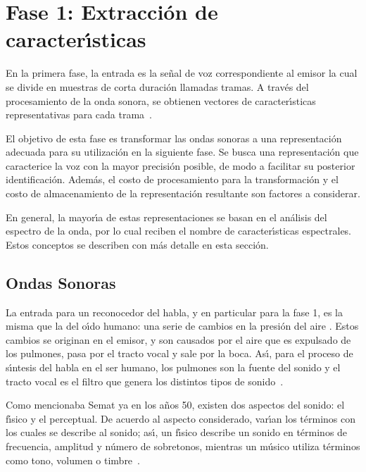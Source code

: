 \section{Fase 1: Extracci\'on de caracter{\'\i}sticas}
\label{sec:featureExtraction}

En la primera fase, la entrada es la se\~nal de voz correspondiente al emisor la cual se divide
en muestras de corta duraci\'on llamadas tramas. A trav\'es del procesamiento de la onda sonora, 
se obtienen vectores de caracter{\'\i}sticas representativas para cada \mbox{trama \cite{Jurafsky}.}

El objetivo de esta fase es transformar las ondas sonoras a una representaci\'on adecuada para 
su utilizaci\'on en la siguiente fase. Se busca una representaci\'on que caracterice la voz con 
la mayor precisi\'on posible, de modo a facilitar su posterior identificaci\'on. Adem\'as, 
el costo de procesamiento para la transformaci\'on y el costo de almacenamiento de la 
representaci\'on resultante son factores a considerar.

En general, la mayor{\'\i}a de estas representaciones se basan en el an\'alisis del espectro
de la onda, por lo cual reciben el nombre de caracter{\'\i}sticas espectrales. 
Estos conceptos se describen con m\'as detalle en esta secci\'on.

\subsection{Ondas Sonoras}

La entrada para un reconocedor del habla, y en particular para la fase 1, es la misma que 
la del o{\'\i}do humano: una serie de cambios en la presi\'on del aire \cite{YoungUniversity2007}. 
Estos cambios se originan en el emisor, y son causados por el aire que es expulsado de los pulmones,
pasa por el tracto vocal y sale por la boca. As{\'\i}, para el 
proceso de s{\'\i}ntesis del habla en el ser humano, los pulmones son la fuente
del sonido y el tracto vocal es el filtro que genera los distintos tipos de \mbox{sonido \cite{BradburyLineal2000}}.

Como mencionaba Semat ya en los a\~nos 50, existen dos aspectos del sonido: el f{\'\i}sico y el 
perceptual. De acuerdo al 
aspecto considerado, var{\'\i}an los t\'erminos con los cuales se describe al sonido; as{\'\i}, un f{\'\i}sico 
describe un sonido en t\'erminos de frecuencia, amplitud y n\'umero de sobretonos, mientras un 
m\'usico utiliza t\'erminos como tono, volumen o \mbox{timbre \cite{SematPhysics1958}}.

